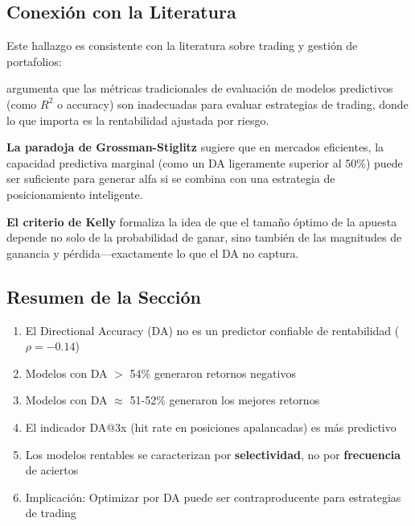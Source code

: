 \subsection{Conexi\'on con la Literatura}
\label{subsec:literature_connection}

Este hallazgo es consistente con la literatura sobre trading y gesti\'on de portafolios:

\textbf{\citet{lopezdeprado2018}} argumenta que las m\'etricas tradicionales de evaluaci\'on de modelos predictivos (como $R^2$ o accuracy) son inadecuadas para evaluar estrategias de trading, donde lo que importa es la rentabilidad ajustada por riesgo.

\textbf{La paradoja de Grossman-Stiglitz} \citep{grossman1980} sugiere que en mercados eficientes, la capacidad predictiva marginal (como un DA ligeramente superior al 50\%) puede ser suficiente para generar alfa si se combina con una estrategia de posicionamiento inteligente.

\textbf{El criterio de Kelly} \citep{kelly1956} formaliza la idea de que el tama\~no \'optimo de la apuesta depende no solo de la probabilidad de ganar, sino tambi\'en de las magnitudes de ganancia y p\'erdida---exactamente lo que el DA no captura.

\subsection{Resumen de la Secci\'on}
\label{subsec:da_summary}

\begin{tcolorbox}[colback=blue!5!white,colframe=blue!75!black,title=Resumen: La Paradoja del DA]
\begin{enumerate}
    \item El Directional Accuracy (DA) no es un predictor confiable de rentabilidad ($\rho = -0.14$)
    \item Modelos con DA $>$ 54\% generaron retornos negativos
    \item Modelos con DA $\approx$ 51-52\% generaron los mejores retornos
    \item El indicador DA@3x (hit rate en posiciones apalancadas) es m\'as predictivo
    \item Los modelos rentables se caracterizan por \textbf{selectividad}, no por \textbf{frecuencia} de aciertos
    \item Implicaci\'on: Optimizar por DA puede ser contraproducente para estrategias de trading
\end{enumerate}
\end{tcolorbox}

